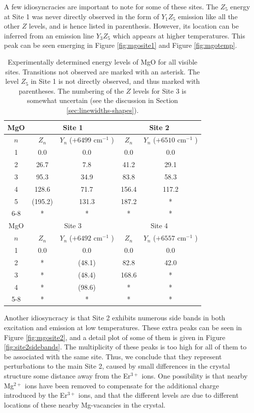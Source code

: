 \documentclass[12pt]{puthesis}
\newcommand{\erbium}[1][ ]{Er$^{3+}$#1}
\newcommand{\wn}[1][ ]{cm$^{-1}$#1}
\begin{document}
A few idiosyncracies are important to note for some of these sites. The $Z_{5}$ energy at Site 1 was never directly observed in the form of $Y_{1}Z_{5}$ emission like all the other $Z$ levels, and is hence listed in parenthesis. However, its location can be inferred from an emission line $Y_{3}Z_{5}$ which appears at higher temperatures. This peak can be seen emerging in Figure \ref{fig:mgosite1} and Figure \ref{fig:mgotemp}.

\begin{table}[t]
  \centering
  \begin{tabular}{| c | c | c | c | c |}
    \hline
    MgO & \multicolumn{2}{c|}{Site 1}& \multicolumn{2}{c|}{Site 2} \\
    \hline
    $n$ & $Z_{n}$ & $Y_{n}$ ($+6499$ \wn) & $Z_{n}$ & $Y_{n}$ ($+6510$ \wn) \\
    \hline 
    1 & 0.0 & 0.0 & 0.0 & 0.0 \\
    2 & 26.7 & 7.8 & 41.2 & 29.1 \\
    3 & 95.3 & 34.9 & 83.8 & 58.3 \\
    4 & 128.6 & 71.7 & 156.4 & 117.2 \\
    5 & (195.2) & 131.3 & 187.2 & * \\
    6-8 & * & * & * & * \\
    \hline \hline
    MgO & \multicolumn{2}{c|}{Site 3}& \multicolumn{2}{c|}{Site 4} \\
    \hline
    $n$ & $Z_{n}$ & $Y_{n}$ ($+6492$ \wn) & $Z_{n}$ & $Y_{n}$ ($+6557$ \wn)\\
    \hline 
    1 & 0.0 & 0.0 & 0.0 & 0.0  \\
    2 & * & (48.1) & 82.8 & 42.0 \\
    3 & * & (48.4) & 168.6 & *  \\
    4 & * & (98.6) & * & * \\
    5-8 & * & * & * & * \\
    \hline
  \end{tabular}
  \caption{Experimentally determined energy levels of MgO for all visible sites. Transitions not observed are marked with an asterisk. The level $Z_{5}$ in Site 1 is not directly observed, and thus marked with parentheses. The numbering of the $Z$ levels for Site 3 is somewhat uncertain (see the discussion in Section \ref{sec:linewidths-shapes}).}
  \label{tab:mgolevels}
\end{table}

Another idiosyncracy is that Site 2 exhibits numerous side bands in both excitation and emission at low temperatures. These extra peaks can be seen in Figure \ref{fig:mgosite2}, and a detail plot of some of them is given in Figure \ref{fig:site2sidebands}. The multiplicity of these peaks is too high for all of them to be associated with the same site. Thus, we conclude that they represent perturbations to the main Site 2, caused by small differences in the crystal structure some distance away from the \erbium ions. One possibility is that nearby Mg$^{2+}$ ions have been removed to compensate for the additional charge introduced by the \erbium ions, and that the different levels are due to different locations of these nearby Mg-vacancies in the crystal.
\end{document}
